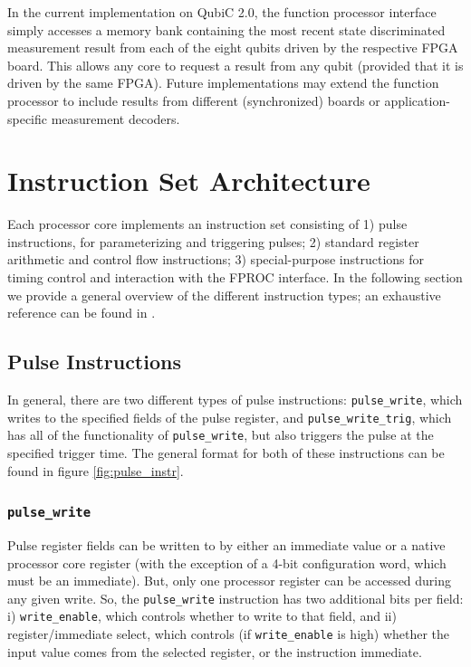 \documentclass[journal]{IEEEtran}
\begin{document}
In the current implementation on QubiC 2.0, the function processor interface simply accesses a memory bank containing the most recent state discriminated measurement result from each of the eight qubits driven by the respective FPGA board. This allows any core to request a result from any qubit (provided that it is driven by the same FPGA). Future implementations may extend the function processor to include results from different (synchronized) boards or application-specific measurement decoders.

\section{Instruction Set Architecture}
\label{sec:instruction_set}

Each processor core implements an instruction set consisting of 1) pulse instructions, for parameterizing and triggering pulses; 2) standard register arithmetic and control flow instructions; 3) special-purpose instructions for timing control and interaction with the FPROC interface. In the following section we provide a general overview of the different instruction types; an exhaustive reference can be found in \cite{qubicisa}.

\subsection{Pulse Instructions}
\label{sec:instruction_set/pulse}

In general, there are two different types of pulse instructions: \verb|pulse_write|, which writes to the specified fields of the pulse register, and \verb|pulse_write_trig|, which has all of the functionality of \verb|pulse_write|, but also triggers the pulse at the specified trigger time. The general format for both of these instructions can be found in figure \ref{fig:pulse_instr}.

\subsubsection{\texttt{pulse\_write}}

Pulse register fields can be written to by either an immediate value or a native processor core register (with the exception of a 4-bit configuration word, which must be an immediate). But, only one processor register can be accessed during any given write. So, the \verb|pulse_write| instruction has two additional bits per field: i) \verb|write_enable|, which controls whether to write to that field, and ii) register/immediate select, which controls (if \verb|write_enable| is high) whether the input value comes from the selected register, or the instruction immediate.
\end{document}
